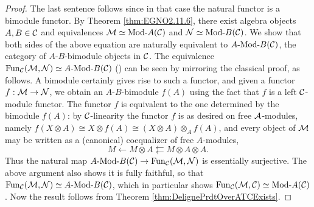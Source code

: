 \documentclass{amsart}
\begin{document}
\begin{proof}
	The last sentence follows since in that case the natural functor is a bimodule functor. By Theorem \ref{thm:EGNO2.11.6}, there exist algebra objects $A, B \in \mathcal C$ and equivalences $\cM \simeq \Mod{}{A}(\cC)$ and $\cN \simeq \Mod{}{B}(\cC)$. We show that both sides of the above equation are naturally equivalent to $\Mod{A}{B}(\cC)$, the category of $A$-$B$-bimodule objects in $\mathcal C$. The equivalence $\Fun_\cC(\cM, \cN) \simeq \Mod{A}{B}(\cC)$ (\cite[Prop 2.12.2]{EGNO}) can be seen by mirroring the classical proof, as follows. A bimodule certainly gives rise to such a functor, 
	and given a functor $f: \mathcal M \rightarrow \mathcal N$, we obtain an $A$-$B$-bimodule $f(A)$ using the fact that $f$ is a left $\mathcal C$-module functor.  The functor $f$ is equivalent to the one determined by the bimodule $f(A)$: by $\mathcal C$-linearity the functor $f$ is as desired on free $\mathcal A$-modules, namely $f(X \otimes A) \cong X \otimes f(A)  \cong (X \otimes A) \otimes_A f(A)$, and every object of $\mathcal M$ may be written as a (canonical) coequalizer of free $A$-modules,
	\begin{equation*}
		M \leftarrow M \otimes A \leftleftarrows M \otimes A \otimes A.
	\end{equation*} 
Thus the natural map  $\Mod{A}{B}(\cC) \to \Fun_\cC(\cM, \cN)$ is essentially surjective. The above argument also shows it is fully faithful, so that $\Fun_\cC(\cM, \cN) \simeq \Mod{A}{B}(\cC)$, which in particular shows $\Fun_\cC(\cM, \cC) \simeq \Mod{}{A}(\cC)$. Now the result follows from Theorem \ref{thm:DelignePrdtOverATCExists}.
\end{proof} 
\end{document}
